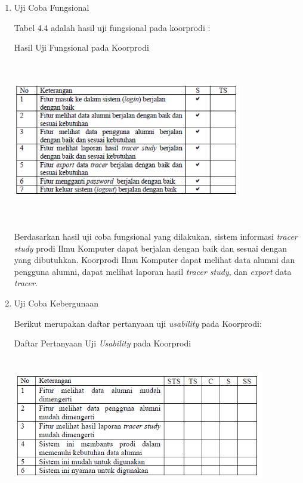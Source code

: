 \begin{enumerate}
	\item Uji Coba Fungsional
	
	Tabel 4.4 adalah hasil uji fungsional pada koorprodi :
	
	\begin{table}[H]
		\centering
		\caption{Hasil Uji Fungsional pada Koorprodi}
		\includegraphics[width=10cm,height=7cm]{gambar/UAT/f_koorprodi}
		\label{f_koorprodi}
	\end{table}
	
	Berdasarkan hasil uji coba fungsional yang dilakukan, sistem informasi
	\textit{tracer study} prodi Ilmu Komputer dapat berjalan dengan baik dan sesuai dengan yang dibutuhkan. Koorprodi Ilmu Komputer dapat melihat data alumni dan pengguna alumni, dapat melihat laporan hasil \textit{tracer study}, dan \textit{export} data \textit{tracer}.
	
	\item Uji Coba Kebergunaan
	
	Berikut merupakan daftar pertanyaan uji \textit{usability} pada Koorprodi:

	\begin{table}[H]
		\centering
		\caption{Daftar Pertanyaan Uji \textit{Usability} pada Koorprodi}
		\includegraphics[width=11cm,height=6cm]{gambar/UAT/u_koorprodi}
		\label{u_koorprodi}
	\end{table}
	

\end{enumerate}
